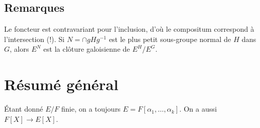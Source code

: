 \documentclass[a4paper,12pt]{book}
\theoremstyle{plain}
\theoremstyle{definition}
\theoremstyle{remark}
\begin{document}
\subsection{Remarques}
Le foncteur est contravariant pour l'inclusion, d'où le compositum
correspond à l'intersection (!). Si $N=\cap gHg^{-1}$ est le plus
petit sous-groupe normal de $H$ dans $G$, alors $E^N$ est la 
clôture galoisienne de $E^H/E^G$.

\section{Résumé général}
Étant donné $E/F$ finie, on a toujours 
$E=F[\alpha_1,\ldots,\alpha_k]$. On a aussi $F[X]\to E[X]$.




\printbibliography
\end{document}
